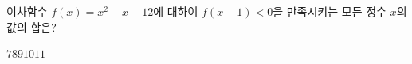 \hspace*{2mm}\begin{minipage}[t]{\dimexpr\linewidth-2mm\relax}\vspace{0pt}
이차함수 $f(x)=x^2-x-12$에 대하여 $f(x-1)<0$을 만족시키는 모든 정수 $x$의 값의 합은?
\begin{choices32}{$7$}{$8$}{$9$}{$10$}{$11$}\end{choices32}\end{minipage}
